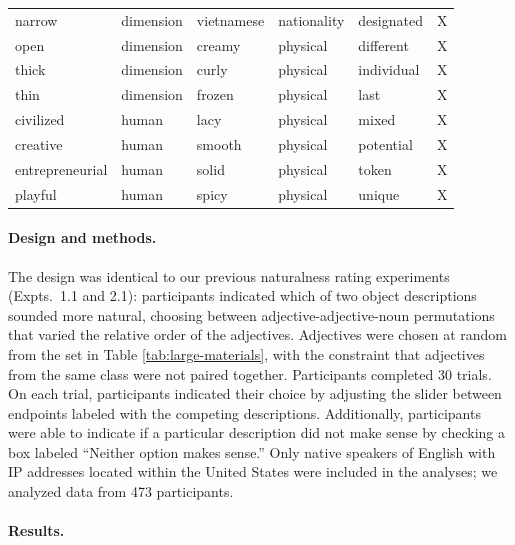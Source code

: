\documentclass[12pt]{article}
\begin{document}
\begin{table}
{\begin{tabular}{@{\vrule height 10.5pt depth2pt  width0pt}llllll}
narrow	&	dimension	&	vietnamese	&	nationality	&	designated	&	X	\\
open	&	dimension	&	creamy	&	physical	&	different	&	X	\\
thick	&	dimension	&	curly	&	physical	&	individual	&	X	\\
thin	&	dimension	&	frozen	&	physical	&	last	&	X	\\
civilized	&	human	&	lacy	&	physical	&	mixed	&	X	\\
creative	&	human	&	smooth	&	physical	&	potential	&	X	\\
entrepreneurial	&	human	&	solid	&	physical	&	token	&	X	\\
playful	&	human	&	spicy	&	physical	&	unique	&	X	\\	\bottomrule												
		\end{tabular}} 
\end{table}


\paragraph{Design and methods.}

The design was identical to our previous naturalness rating experiments (Expts.~1.1 and 2.1): participants indicated which of two object descriptions sounded more natural, choosing between adjective-adjective-noun permutations that varied the relative order of the adjectives. Adjectives were chosen at random from the set in Table \ref{tab:large-materials}, with the constraint that adjectives from the same class were not paired together.
%
Participants completed 30 trials. On each trial, participants indicated their choice by adjusting the slider between endpoints labeled with the competing descriptions. Additionally, participants were able to indicate if a particular description did not make sense by checking a box labeled ``Neither option makes sense.'' Only native speakers of English with IP addresses located within the United States were included in the analyses; we analyzed data from 473 participants.

\paragraph{Results.}

\end{document}

